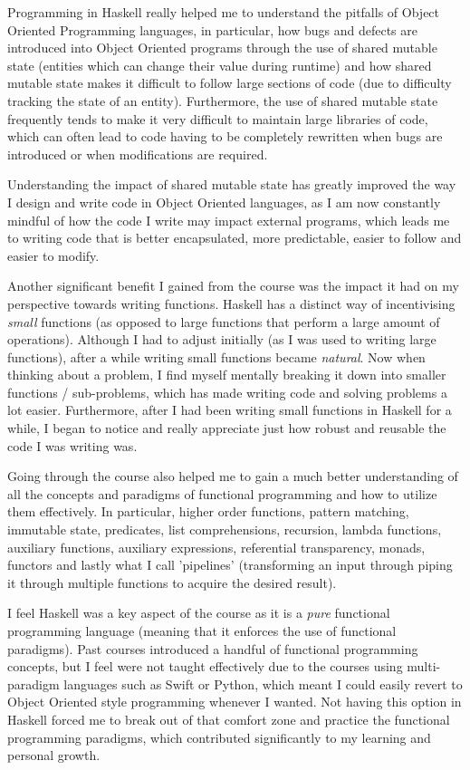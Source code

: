\documentclass[11pt, a4paper]{article}
\begin{document}
Programming in Haskell really helped me to understand the pitfalls of Object Oriented Programming languages, in particular, how bugs and defects are introduced into Object Oriented programs through the use of shared mutable state (entities which can change their value during runtime) and how shared mutable state makes it difficult to follow large sections of code (due to difficulty tracking the state of an entity). Furthermore, the use of shared mutable state frequently tends to make it very difficult to maintain large libraries of code, which can often lead to code having to be completely rewritten when bugs are introduced or when modifications are required.

Understanding the impact of shared mutable state has greatly improved the way I design and write code in Object Oriented languages, as I am now constantly mindful of how the code I write may impact external programs, which leads me to writing code that is better encapsulated, more predictable, easier to follow and easier to modify. 

Another significant benefit I gained from the course was the impact it had on my perspective towards writing functions. Haskell has a distinct way of incentivising \emph{small} functions (as opposed to large functions that perform a large amount of operations). Although I had to adjust initially (as I was used to writing large functions), after a while writing small functions became \emph{natural}. Now when thinking about a problem, I find myself mentally breaking it down into smaller functions / sub-problems, which has made writing code and solving problems a lot easier. Furthermore, after I had been writing small functions in Haskell for a while, I began to notice and really appreciate just how robust and reusable the code I was writing was.

Going through the course also helped me to gain a much better understanding of all the concepts and paradigms of functional programming and how to utilize them effectively. In particular, higher order functions, pattern matching, immutable state, predicates, list comprehensions, recursion, lambda functions, auxiliary functions, auxiliary expressions, referential transparency, monads, functors and lastly what I call 'pipelines' (transforming an input through piping it through multiple functions to acquire the desired result).

I feel Haskell was a key aspect of the course as it is a \emph{pure} functional programming language (meaning that it enforces the use of functional paradigms). Past courses introduced a handful of functional programming concepts, but I feel were not taught effectively due to the courses using multi-paradigm languages such as Swift or Python, which meant I could easily revert to Object Oriented style programming whenever I wanted. Not having this option in Haskell forced me to break out of that comfort zone and practice the functional programming paradigms, which contributed significantly to my learning and personal growth.
\end{document}
